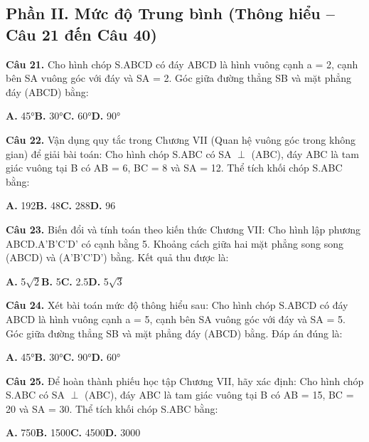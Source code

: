 \documentclass[11pt,a4paper]{article}
\begin{document}
\subsection*{\color{accent} Phần II. Mức độ Trung bình (Thông hiểu -- Câu 21 đến Câu 40)}
\textbf{\color{primary} Câu 21.} Cho hình chóp S.ABCD có đáy ABCD là hình vuông cạnh a = 2, cạnh bên SA vuông góc với đáy và SA = 2. Góc giữa đường thẳng SB và mặt phẳng đáy (ABCD) bằng:\par
\hspace*{1.5em}\textbf{A.} 45°\quad\quad \textbf{B.} 30°\quad\quad \textbf{C.} 60°\quad\quad \textbf{D.} 90°\par\vspace{2pt}
\textbf{\color{primary} Câu 22.} Vận dụng quy tắc trong Chương VII (Quan hệ vuông góc trong không gian) để giải bài toán: Cho hình chóp S.ABC có SA $\perp$ (ABC), đáy ABC là tam giác vuông tại B có AB = 6, BC = 8 và SA = 12. Thể tích khối chóp S.ABC bằng:\par
\hspace*{1.5em}\textbf{A.} 192\quad\quad \textbf{B.} 48\quad\quad \textbf{C.} 288\quad\quad \textbf{D.} 96\par\vspace{2pt}
\textbf{\color{primary} Câu 23.} Biến đổi và tính toán theo kiến thức Chương VII: Cho hình lập phương ABCD.A'B'C'D' có cạnh bằng 5. Khoảng cách giữa hai mặt phẳng song song (ABCD) và (A'B'C'D') bằng. Kết quả thu được là:\par
\hspace*{1.5em}\textbf{A.} 5$\sqrt{2}$\quad\quad \textbf{B.} 5\quad\quad \textbf{C.} 2.5\quad\quad \textbf{D.} 5$\sqrt{3}$\par\vspace{2pt}
\textbf{\color{primary} Câu 24.} Xét bài toán mức độ thông hiểu sau: Cho hình chóp S.ABCD có đáy ABCD là hình vuông cạnh a = 5, cạnh bên SA vuông góc với đáy và SA = 5. Góc giữa đường thẳng SB và mặt phẳng đáy (ABCD) bằng. Đáp án đúng là:\par
\hspace*{1.5em}\textbf{A.} 45°\quad\quad \textbf{B.} 30°\quad\quad \textbf{C.} 90°\quad\quad \textbf{D.} 60°\par\vspace{2pt}
\textbf{\color{primary} Câu 25.} Để hoàn thành phiếu học tập Chương VII, hãy xác định: Cho hình chóp S.ABC có SA $\perp$ (ABC), đáy ABC là tam giác vuông tại B có AB = 15, BC = 20 và SA = 30. Thể tích khối chóp S.ABC bằng:\par
\hspace*{1.5em}\textbf{A.} 750\quad\quad \textbf{B.} 1500\quad\quad \textbf{C.} 4500\quad\quad \textbf{D.} 3000\par\vspace{2pt}
\end{document}
